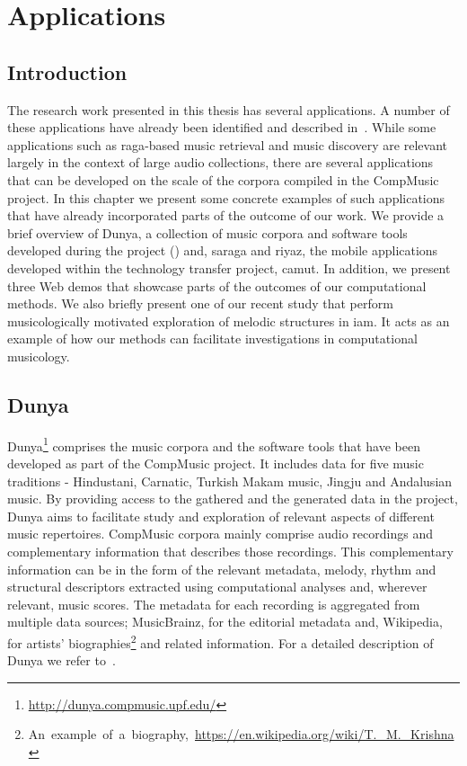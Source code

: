 
\chapter{Applications}
\label{chap:applicatoins}

\section{Introduction}
\label{sec:applications_introduction}

The research work presented in this thesis has several applications. A number of these applications have already been identified and described in~. While some applications such as \gls{raga}-based music retrieval and music discovery are relevant largely in the context of large audio collections, there are several applications that can be developed on the scale of the corpora compiled in the CompMusic project. In this chapter we present some concrete examples of such applications that have already incorporated parts of the outcome of our work. We provide a brief overview of Dunya, a collection of music corpora and software tools developed during the project () and, \Gls{saraga} and \Gls{riyaz}, the mobile applications developed within the technology transfer project, \gls{camut}. In addition, we present three Web demos that showcase parts of the outcomes of our computational methods. We also briefly present one of our recent study that perform musicologically motivated exploration of melodic structures in \gls{iam}. It acts as an example of how our methods can facilitate investigations in computational musicology.

\section{Dunya}
\label{sec:applications_dunya}

Dunya\footnote{\url{http://dunya.compmusic.upf.edu/}} comprises the music corpora and the software tools that have been developed as part of the CompMusic project. It includes data for five music traditions - Hindustani, Carnatic, Turkish Makam music, Jingju and Andalusian music. By providing access to the gathered and the generated data in the project, Dunya aims to facilitate study and exploration of relevant aspects of different music repertoires. CompMusic corpora mainly comprise audio recordings and complementary information that describes those recordings. This complementary information can be in the form of the relevant metadata, melody, rhythm and structural descriptors extracted using computational analyses and, wherever relevant, music scores. The metadata for each recording is aggregated from multiple data sources; MusicBrainz, for the editorial metadata and, Wikipedia, for artists' biographies\footnote{An~example~of~a~biography,~\url{https://en.wikipedia.org/wiki/T._M._Krishna}} and related information. For a detailed description of Dunya we refer to~\cite{dunya_porter}.

